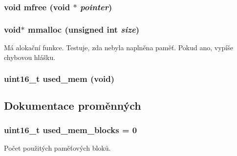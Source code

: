 \subsubsection[{mfree}]{\setlength{\rightskip}{0pt plus 5cm}void mfree (void $\ast$ {\em pointer})}\label{memory_8c_a9ba414662a250ef92d4296a19dafad43}
\subsubsection[{mmalloc}]{\setlength{\rightskip}{0pt plus 5cm}void$\ast$ mmalloc (unsigned int {\em size})}\label{memory_8c_ac1847e839d655a069b4c77d164f395c5}
Má alokační funkce. Testuje, zda nebyla naplněna paměť. Pokud ano, vypíše chybovou hlášku. 
\subsubsection[{used\_\-mem}]{\setlength{\rightskip}{0pt plus 5cm}uint16\_\-t used\_\-mem (void)}\label{memory_8c_a8dae36488b9df941d0d6734093c03c1f}


\subsection{Dokumentace proměnných}
\subsubsection[{used\_\-mem\_\-blocks}]{\setlength{\rightskip}{0pt plus 5cm}uint16\_\-t {\bf used\_\-mem\_\-blocks} = 0}\label{memory_8c_ad1acea3e104f63e81b2e128dc46222d9}


Počet použitých paměťových bloků. 